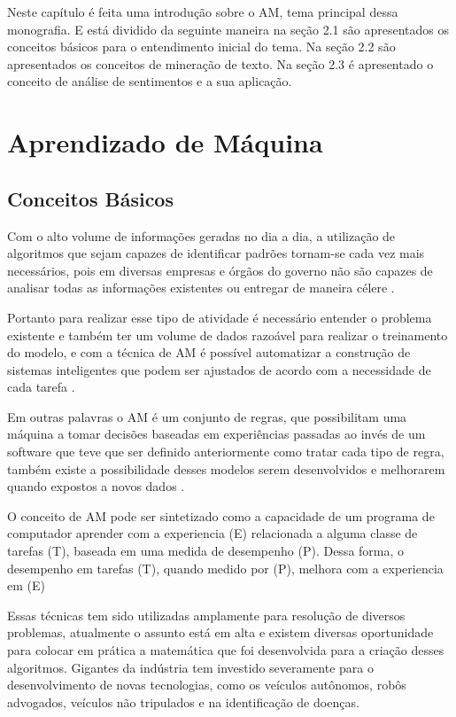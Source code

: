 Neste capítulo é feita uma introdução sobre o \acrshort{AM}, tema principal dessa monografia. E está dividido da seguinte
maneira na seção 2.1 são apresentados os conceitos básicos para o entendimento inicial do tema. Na seção 2.2 são apresentados
os conceitos de mineração de texto. Na seção 2.3 é apresentado o conceito de análise de sentimentos e a sua aplicação.


\section{Aprendizado de Máquina}
  \subsection{Conceitos Básicos}

    Com o alto volume de informações geradas no dia a dia, a utilização de algoritmos que sejam capazes de identificar padrões tornam-se cada
    vez mais necessários, pois em diversas empresas e órgãos do governo não são capazes de analisar todas as informações existentes ou entregar
    de maneira célere \cite{nasrabadi2007pattern}. 
    
    Portanto para realizar esse tipo de atividade é necessário entender o problema existente e também ter um volume de dados razoável para realizar o treinamento do modelo, e com a técnica de \acrshort{AM} é possível automatizar a construção
    de sistemas inteligentes que podem ser ajustados de acordo com a necessidade de cada tarefa \cite{bonaccorso2017machine}.

    Em outras palavras o \acrshort{AM} é um conjunto de regras, que possibilitam uma máquina a tomar decisões baseadas em experiências passadas ao invés
    de um software que teve que ser definido anteriormente como tratar cada tipo de regra, também existe a possibilidade desses modelos serem desenvolvidos
    e melhorarem quando expostos a novos dados \cite{zurada1995review}.


    O conceito de \acrshort{AM} pode ser sintetizado como a capacidade de um programa de computador aprender com a experiencia (E) relacionada a alguma 
    classe de tarefas (T), baseada em uma medida de desempenho (P). Dessa forma, o desempenho em tarefas (T), quando medido por (P), melhora com a 
    experiencia em (E) \cite{mitchell}

    Essas técnicas tem sido utilizadas amplamente para resolução de diversos problemas, atualmente o assunto está em alta e existem diversas oportunidade
    para colocar em prática a matemática que foi desenvolvida para a criação desses algoritmos. Gigantes da indústria tem investido severamente para
    o desenvolvimento de novas tecnologias, como os veículos autônomos, robôs advogados, veículos não tripulados e na identificação de doenças.

